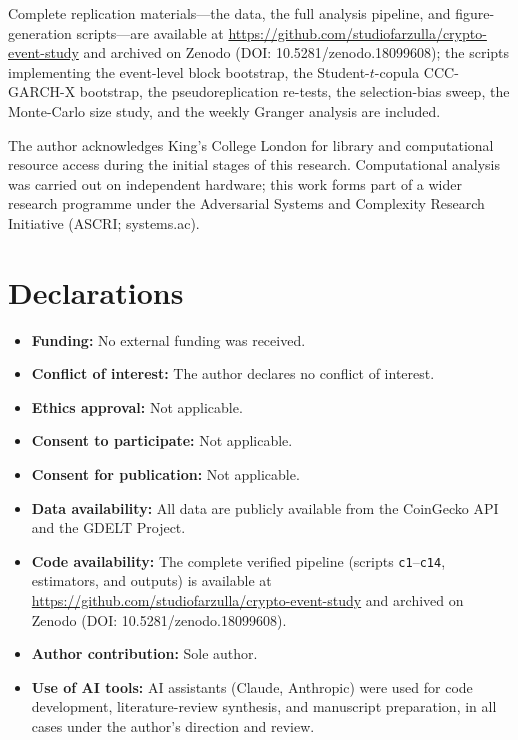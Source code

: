 \documentclass[pdflatex,sn-mathphys-num]{sn-jnl}
\theoremstyle{thmstyleone}
\theoremstyle{thmstyletwo}
\theoremstyle{thmstylethree}
\begin{document}
\backmatter


Complete replication materials---the data, the full analysis pipeline, and figure-generation scripts---are available at \url{https://github.com/studiofarzulla/crypto-event-study} and archived on Zenodo (DOI: 10.5281/zenodo.18099608); the scripts implementing the event-level block bootstrap, the Student-$t$-copula CCC-GARCH-X bootstrap, the pseudoreplication re-tests, the selection-bias sweep, the Monte-Carlo size study, and the weekly Granger analysis are included.


The author acknowledges King's College London for library and computational resource access during the initial stages of this research. Computational analysis was carried out on independent hardware; this work forms part of a wider research programme under the Adversarial Systems and Complexity Research Initiative (ASCRI; systems.ac).

\section*{Declarations}

\begin{itemize}
\item \textbf{Funding:} No external funding was received.
\item \textbf{Conflict of interest:} The author declares no conflict of interest.
\item \textbf{Ethics approval:} Not applicable.
\item \textbf{Consent to participate:} Not applicable.
\item \textbf{Consent for publication:} Not applicable.
\item \textbf{Data availability:} All data are publicly available from the CoinGecko API and the GDELT Project.
\item \textbf{Code availability:} The complete verified pipeline (scripts \texttt{c1}--\texttt{c14}, estimators, and outputs) is available at \url{https://github.com/studiofarzulla/crypto-event-study} and archived on Zenodo (DOI: 10.5281/zenodo.18099608).
\item \textbf{Author contribution:} Sole author.
\item \textbf{Use of AI tools:} AI assistants (Claude, Anthropic) were used for code development, literature-review synthesis, and manuscript preparation, in all cases under the author's direction and review.
\end{itemize}
\end{document}

